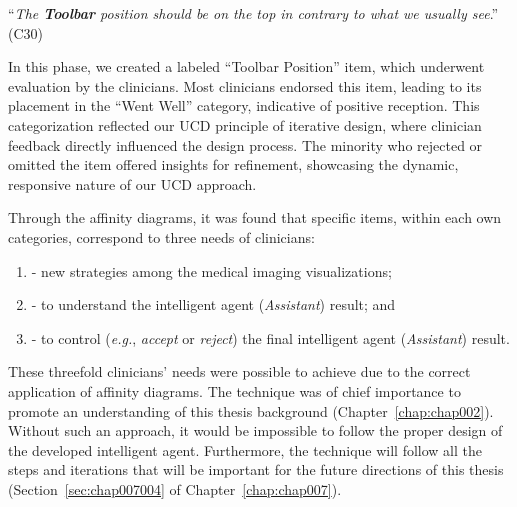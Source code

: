 
\vspace{2.50mm}

\noindent
``{\it The {\bf Toolbar} position should be on the top in contrary to what we usually see}.'' (C30)

\vspace{2.50mm}

\textcolor{revised}{In this phase, we created a labeled ``Toolbar Position'' item, which underwent evaluation by the clinicians.
Most clinicians endorsed this item, leading to its placement in the ``Went Well'' category, indicative of positive reception.
This categorization reflected our \ac{UCD} principle of iterative design, where clinician feedback directly influenced the design process.
The minority who rejected or omitted the item offered insights for refinement, showcasing the dynamic, responsive nature of our \ac{UCD} approach.}

\vspace{1.00mm}

\noindent
Through the affinity diagrams, it was found that specific items, within each own categories, correspond to three needs of clinicians:

\vspace{0.10mm}

\begin{enumerate}[label=\alph*]
\item - new strategies among the medical imaging visualizations;
\item - to understand the intelligent agent ({\it Assistant}) result; and
\item - to control ({\it e.g.}, {\it accept} or {\it reject}) the final intelligent agent ({\it Assistant}) result.
\end{enumerate}

\vspace{0.10mm}

These threefold clinicians' needs were possible to achieve due to the correct application of affinity diagrams.
The technique was of chief importance to promote an understanding of this thesis background (Chapter~\ref{chap:chap002}).
Without such an approach, it would be impossible to follow the proper design of the developed intelligent agent.
Furthermore, the technique will follow all the steps and iterations that will be important for the future directions of this thesis (Section~\ref{sec:chap007004} of Chapter~\ref{chap:chap007}).

